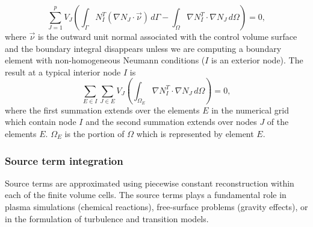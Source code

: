 \begin{equation}
\sum^p_{J=1}  V_J \left( \int_{\Gamma}{N^T_I\left( \nabla N_J\cdot \vec \nu \right)\,d\Gamma}- \int_{\Omega}{ \nabla N^T_I\cdot \nabla N_J\,d\Omega}\right)= 0,
\end{equation}
where $\vec \nu$ is the outward unit normal associated with the control volume surface and the boundary integral disappears unless we are computing a boundary element with non-homogeneous Neumann conditions ($I$ is an exterior node). The result at a typical interior node $I$ is
\begin{equation}
\sum_{E\in I}\sum_{J\in E} V_J\left ( \int_{\Omega_E}{ \nabla N^T_I\cdot \nabla N_J\,d\Omega}\right)=0,
\end{equation}
where the first summation extends over the elements $E$ in the numerical grid which contain node $I$ and the second summation extends over nodes $J$ of the elements $E$. $\Omega_E$ is the portion of $\Omega$ which is represented by element $E$.
\subsubsection*{Source term integration}
Source terms are approximated using piecewise constant reconstruction within each of the finite volume cells. The source terms plays a fundamental role in plasma simulations (chemical reactions), free-surface problems (gravity effects), or in the formulation of turbulence and transition models.

